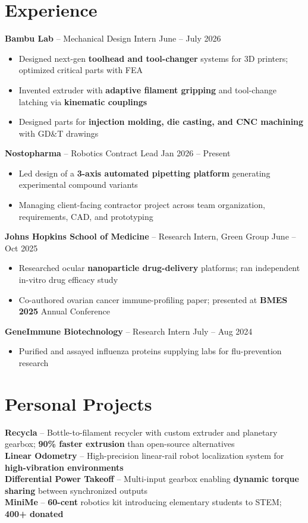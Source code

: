\documentclass[10pt, letterpaper]{article}
\begin{document}
\section{Experience}
    \textbf{Bambu Lab} -- Mechanical Design Intern
    \hfill June -- July 2026
    \begin{itemize}
        \item Designed next-gen \textbf{toolhead and tool-changer} systems for 3D printers; optimized critical parts with FEA
        \item Invented extruder with \textbf{adaptive filament gripping} and tool-change latching via \textbf{kinematic couplings}
        \item Designed parts for \textbf{injection molding, die casting, and CNC machining} with GD\&T drawings
    \end{itemize}
    \textbf{Nostopharma} -- Robotics Contract Lead
    \hfill Jan 2026 -- Present
    \begin{itemize}
        \item Led design of a \textbf{3-axis automated pipetting platform} generating experimental compound variants
        \item Managing client-facing contractor project across team organization, requirements, CAD, and prototyping
    \end{itemize}
    \textbf{Johns Hopkins School of Medicine} -- Research Intern, Green Group
    \hfill June -- Oct 2025
    \begin{itemize}
        \item Researched ocular \textbf{nanoparticle drug-delivery} platforms; ran independent in-vitro drug efficacy study
        \item Co-authored ovarian cancer immune-profiling paper; presented at \textbf{BMES 2025} Annual Conference
    \end{itemize}
    \textbf{GeneImmune Biotechnology} -- Research Intern
    \hfill July -- Aug 2024
    \begin{itemize}
        \item Purified and assayed influenza proteins supplying labs for flu-prevention research
    \end{itemize}

\section{Personal Projects}
    \textbf{Recycla} -- Bottle-to-filament recycler with custom extruder and planetary gearbox; \textbf{90\% faster extrusion} than open-source alternatives\\
    \textbf{Linear Odometry} -- High-precision linear-rail robot localization system for \textbf{high-vibration environments} \\
    \textbf{Differential Power Takeoff} -- Multi-input gearbox enabling \textbf{dynamic torque sharing} between synchronized outputs \\
    \textbf{MiniMe} -- \textbf{60-cent} robotics kit introducing elementary students to STEM; \textbf{400+ donated}
\end{document}
